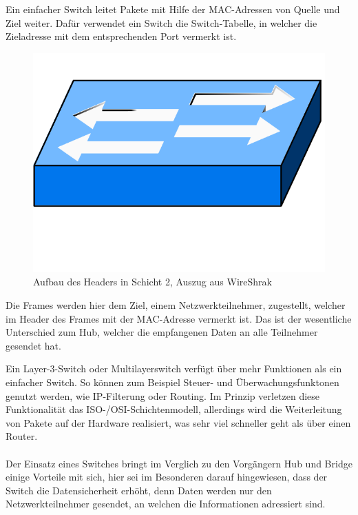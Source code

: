 Ein einfacher Switch leitet Pakete mit Hilfe der MAC-Adressen von Quelle und Ziel weiter. Dafür verwendet ein Switch die Switch-Tabelle, in welcher die Zieladresse mit dem entsprechenden Port vermerkt ist.
\begin{figure}[H]
	\centering
	\includegraphics[width=0.3\linewidth]{images/switch.png}
	\caption{Aufbau des Headers in Schicht 2, Auszug aus WireShrak}
\end{figure}
Die Frames werden hier dem Ziel, einem Netzwerkteilnehmer, zugestellt, welcher im Header des Frames mit der MAC-Adresse vermerkt ist. Das ist der wesentliche Unterschied zum Hub, welcher die empfangenen Daten an alle Teilnehmer gesendet hat.

Ein Layer-3-Switch oder Multilayerswitch verfügt über mehr Funktionen als ein einfacher Switch. So können zum Beispiel Steuer- und Überwachungsfunktonen genutzt werden, wie IP-Filterung oder Routing. Im Prinzip verletzen diese Funktionalität das ISO-/OSI-Schichtenmodell, allerdings wird die Weiterleitung von Pakete auf der Hardware realisiert, was sehr viel schneller geht als über einen Router.
\\ \\
Der Einsatz eines Switches bringt im Verglich zu den Vorgängern Hub und Bridge einige Vorteile mit sich, hier sei im Besonderen darauf hingewiesen, dass der Switch die Datensicherheit erhöht, denn Daten werden nur den Netzwerkteilnehmer gesendet, an welchen die Informationen adressiert sind.

